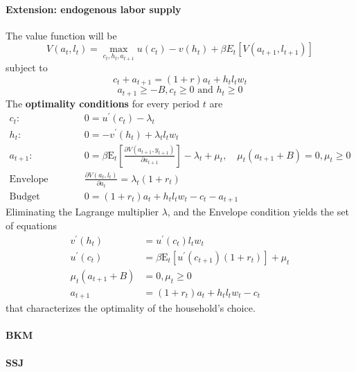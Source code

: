 \documentclass[11pt,a4paper]{article}
\begin{document}
\paragraph{Extension: endogenous labor supply}
The value function will be 
\begin{equation}
    V(a_t,l_t) = \max_{c_t,h_t,a_{t+1}} u(c_t)-v(h_t) + \beta E_t [V(a_{t+1},l_{t+1})]
\end{equation}
subject to $$ c_t + a_{t+1} = (1+r)a_t + h_t l_t w_t $$
$$a_{t+1}\geq -B,c_t\geq 0 \text{ and }h_t\geq 0$$
The \textbf{optimality conditions} for every period $t$ are 
$$
\begin{aligned}
c_t:& \quad 0 =u^{\prime}\left(c_t\right)-\lambda_t \\
h_t:& \quad 0 =-v^{\prime}\left(h_t\right)+\lambda_t l_t w_t \\
a_{t+1}: &\quad 0  =\beta \mathrm{E}_t\left[\frac{\partial V\left(a_{t+1}, y_{t+1}\right)}{\partial a_{t+1}}\right]-\lambda_t+\mu_t, \quad \mu_t\left(a_{t+1}+B\right)=0, \mu_t \geq 0 \\
\text{Envelope condition:}&\quad \frac{\partial V\left(a_t, l_t\right)}{\partial a_t}  =\lambda_t\left(1+r_t\right) \\
\text{Budget constraint:}&\quad 0  =\left(1+r_t\right) a_t+h_t l_t w_t-c_t-a_{t+1}
\end{aligned}
$$
Eliminating the Lagrange multiplier $\lambda$, and the Envelope condition yields the set of equations 
$$
\begin{aligned}
v^{\prime}\left(h_t\right) & =u^{\prime}\left(c_t\right) l_t w_t \\
u^{\prime}\left(c_t\right) & =\beta \mathrm{E}_t\left[u^{\prime}\left(c_{t+1}\right)\left(1+r_t\right)\right]+\mu_t \\
\mu_t\left(a_{t+1}+B\right) & =0, \mu_t \geq 0 \\
a_{t+1} & =\left(1+r_t\right) a_t+h_t l_t w_t-c_t
\end{aligned}
$$
that characterizes the optimality of the household’s choice. 


\paragraph{BKM\citep{boppartExploitingMITShocks2018}}




\paragraph{SSJ\citep{auclertUsingSequenceSpaceJacobian2021}}



\end{document}
